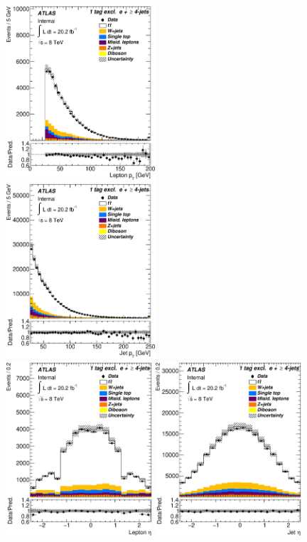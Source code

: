 \begin{figure}[!hb]
\begin{center}

		\includegraphics[height=65mm]{chapters/whel/figures/control_Plots2/bTag_1excl/LeptonPt_el}
		\includegraphics[height=65mm]{chapters/whel/figures/control_Plots2/bTag_1excl/JetPt_el}\\
		\includegraphics[height=65mm]{chapters/whel/figures/control_Plots2/bTag_1excl/LeptonEta_el}
		\includegraphics[height=65mm]{chapters/whel/figures/control_Plots2/bTag_1excl/JetEta_el}\\

\end{center}
\end{figure}
